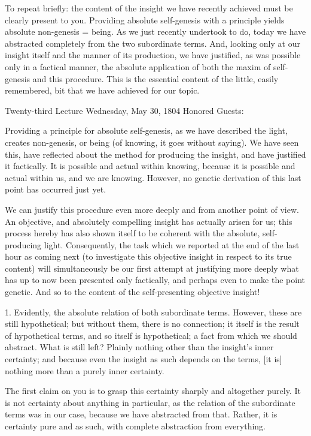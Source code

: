 To repeat briefly:
the content of the insight we have recently achieved
must be clearly present to you.
Providing absolute self-genesis with a principle
yields absolute non-genesis = being.
As we just recently undertook to do,
today we have abstracted completely
from the two subordinate terms.
And, looking only at our insight itself
and the manner of its production, we have justified,
as was possible only in a factical manner,
the absolute application of both
the maxim of self-genesis and this procedure.
This is the essential content of the little, easily remembered,
bit that we have achieved for our topic.

Twenty-third Lecture
Wednesday, May 30, 1804
Honored Guests:

Providing a principle for absolute self-genesis,
as we have described the light, creates non-genesis,
or being (of knowing, it goes without saying).
We have seen this, have reflected about
the method for producing the insight,
and have justified it factically.
It is possible and actual within knowing,
because it is possible and actual within us,
and we are knowing.
However, no genetic derivation of
this last point has occurred just yet.

We can justify this procedure even more deeply
and from another point of view.
An objective, and absolutely compelling insight
has actually arisen for us;
this process hereby has also shown itself
to be coherent with the absolute, self-producing light.
Consequently, the task which we reported
at the end of the last hour as coming next
(to investigate this objective insight
in respect to its true content)
will simultaneously be our first attempt at justifying more deeply
what has up to now been presented only factically,
and perhaps even to make the point genetic.
And so to the content of the self-presenting objective insight!

1. Evidently, the absolute relation of both subordinate terms.
However, these are still hypothetical;
but without them, there is no connection;
it itself is the result of hypothetical terms,
and so itself is hypothetical;
a fact from which we should abstract.
What is still left?
Plainly nothing other than the insight's inner certainty;
and because even the insight as such depends on the terms,
[it is] nothing more than a purely inner certainty.

The first claim on you is to grasp
this certainty sharply and altogether purely.
It is not certainty about anything in particular,
as the relation of the subordinate terms was in our case,
because we have abstracted from that.
Rather, it is certainty pure and as such,
with complete abstraction from everything.

